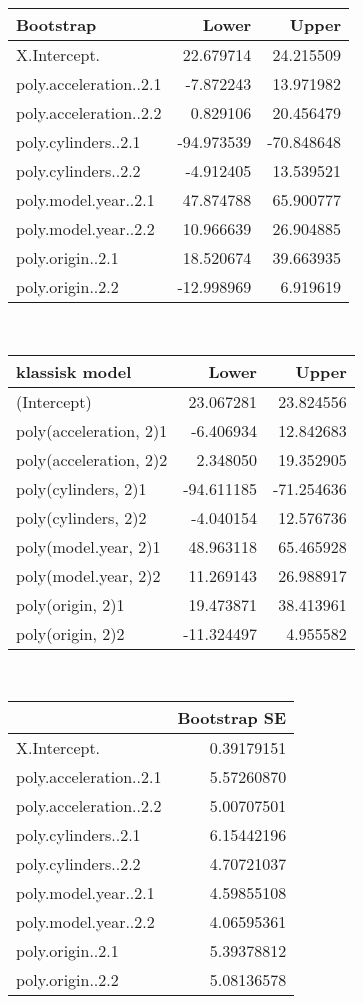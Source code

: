 \begin{tabular}{lrr}
\toprule
Bootstrap	& Lower & Upper \\
\midrule
	X.Intercept. & 22.679714 & 24.215509 \\
	poly.acceleration..2.1 & -7.872243 & 13.971982 \\
	poly.acceleration..2.2 & 0.829106 & 20.456479 \\
	poly.cylinders..2.1 & -94.973539 & -70.848648 \\
	poly.cylinders..2.2 & -4.912405 & 13.539521 \\
	poly.model.year..2.1 & 47.874788 & 65.900777 \\
	poly.model.year..2.2 & 10.966639 & 26.904885 \\
	poly.origin..2.1 & 18.520674 & 39.663935 \\
	poly.origin..2.2 & -12.998969 & 6.919619 \\
\bottomrule
\end{tabular}
\\

\begin{tabular}{lrr}
\toprule
klassisk model	& Lower & Upper \\
\midrule
	(Intercept) & 23.067281 & 23.824556 \\
	poly(acceleration, 2)1 & -6.406934 & 12.842683 \\
	poly(acceleration, 2)2 & 2.348050 & 19.352905 \\
	poly(cylinders, 2)1 & -94.611185 & -71.254636 \\
	poly(cylinders, 2)2 & -4.040154 & 12.576736 \\
	poly(model.year, 2)1 & 48.963118 & 65.465928 \\
	poly(model.year, 2)2 & 11.269143 & 26.988917 \\
	poly(origin, 2)1 & 19.473871 & 38.413961 \\
	poly(origin, 2)2 & -11.324497 & 4.955582 \\
\bottomrule
\end{tabular}
\\
\begin{tabular}{lr}
\toprule
	& Bootstrap SE \\
\midrule
	X.Intercept. & 0.39179151 \\
	poly.acceleration..2.1 & 5.57260870 \\
	poly.acceleration..2.2 & 5.00707501 \\
	poly.cylinders..2.1 & 6.15442196 \\
	poly.cylinders..2.2 & 4.70721037 \\
	poly.model.year..2.1 & 4.59855108 \\
	poly.model.year..2.2 & 4.06595361 \\
	poly.origin..2.1 & 5.39378812 \\
	poly.origin..2.2 & 5.08136578 \\
\bottomrule
\end{tabular}
\\

